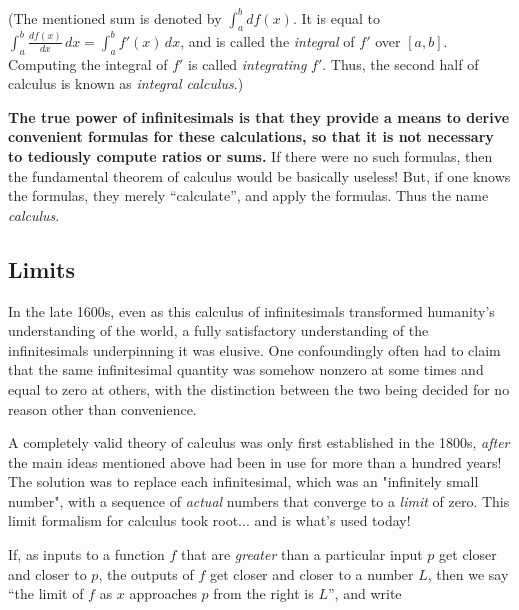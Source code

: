 (The mentioned sum is denoted by $\int^b_a df(x)$. It is equal to $\int^b_a \frac{df(x)}{dx}\, dx = \int^b_a f'(x)\, dx$, and is called the \textit{integral} of $f'$ over $[a, b]$. Computing the integral of $f'$ is called \textit{integrating} $f'$. Thus, the second half of calculus is known as \textit{integral calculus}.)

\textbf{The true power of infinitesimals is that they provide a means to derive convenient formulas for these calculations, so that it is not necessary to tediously compute ratios or sums.} If there were no such formulas, then the fundamental theorem of calculus would be basically useless! But, if one knows the formulas, they merely ``calculate'', and apply the formulas. Thus the name \textit{calculus}.

\subsection*{Limits}

In the late 1600s, even as this calculus of infinitesimals transformed humanity's understanding of the world, a fully satisfactory understanding of the infinitesimals underpinning it was elusive. One confoundingly often had to claim that the same infinitesimal quantity was somehow nonzero at some times and equal to zero at others, with the distinction between the two being decided for no reason other than convenience.

A completely valid theory of calculus was only first established in the 1800s, \textit{after} the main ideas mentioned above had been in use for more than a hundred years! The solution was to replace each infinitesimal, which was an "infinitely small number", with a sequence of \textit{actual} numbers that converge to a \textit{limit} of zero. This limit formalism for calculus took root... and is what's used today\footnotemark!


If, as inputs to a function $f$ that are \textit{greater} than a particular input $p$ get closer and closer to $p$, the outputs of $f$ get closer and closer to a number $L$, then we say ``the limit of $f$ as $x$ approaches $p$ from the right is $L$'', and write

